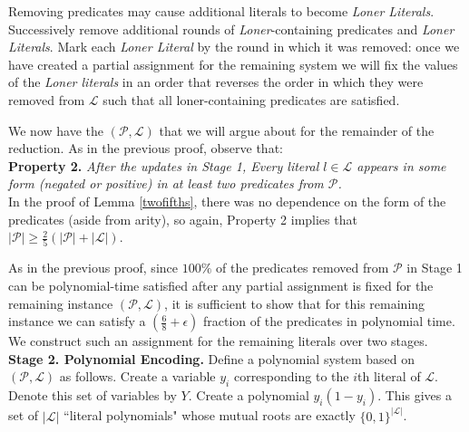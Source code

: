 \documentclass{article}
\begin{document}
Removing predicates may cause additional literals to become \textit{Loner Literals}. Successively remove additional rounds of \textit{Loner}-containing predicates and \textit{Loner Literals}. Mark each \textit{Loner Literal} by the round in which it was removed: once we have created a partial assignment for the remaining system we will fix the values of the \textit{Loner literals} in an order that reverses the order in which they were removed from $\mathcal{L}$ such that all loner-containing predicates are satisfied. 

We now have the $(\mathcal{P}, \mathcal{L})$ that we will argue about for the remainder of the reduction. As in the previous proof, observe that: \\

\noindent \textbf{Property 2.} \textit{After the updates in Stage 1, Every literal $l\in \mathcal{L}$ appears in some form (negated or positive) in at least two predicates from $\mathcal{P}$.}\\

In the proof of Lemma \ref{twofifths}, there was no dependence on the form of the predicates (aside from arity), so again, Property 2 implies that $|\mathcal{P}|\geq\frac{2}{5}(|\mathcal{P}|+|\mathcal{L}|)$.

As in the previous proof, since $100\%$ of the predicates removed from $\mathcal{P}$ in Stage 1 can be polynomial-time satisfied after any partial assignment is fixed for the remaining instance $(\mathcal{P}, \mathcal{L})$, it is sufficient to show that for this remaining instance we can satisfy a $(\frac{6}{8}+\epsilon)$ fraction of the predicates in polynomial time. We construct such an assignment for the remaining literals over two stages.\\

\noindent \textbf{Stage 2. Polynomial Encoding. } Define a polynomial system based on $(\mathcal{P}, \mathcal{L})$ as follows. Create a variable $y_i$ corresponding to the $i$th literal of $\mathcal{L}$. Denote this set of variables by $Y$. Create a polynomial $y_i(1-y_i)$. This gives a set of $|\mathcal{L}|$ ``literal polynomials" whose mutual roots are exactly $\{0,1\}^{|\mathcal{L}|}$. 
\end{document}
